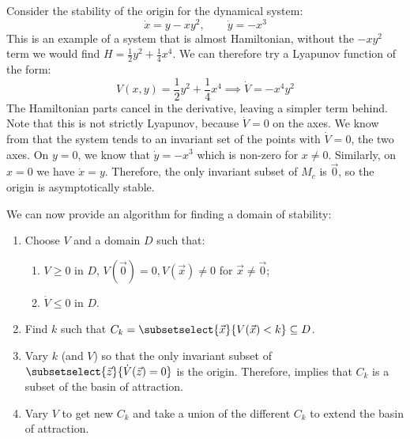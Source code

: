 \documentclass[../Main.tex]{subfiles}
\begin{document}
\begin{example}
    Consider the stability of the origin for the dynamical system:
    \begin{equation*}
        \dot{x} = y - xy^2,\qquad \dot{y} = -x^3
    \end{equation*}
    This is an example of a system that is almost Hamiltonian, without the $-xy^2$ term we would find $H = \frac12 y^2 + \frac14 x^4$. We can therefore try a Lyapunov function of the form:
    \begin{equation*}
        V(x, y) = \frac12 y^2 + \frac14 x^4 \implies \dot{V} = -x^4 y^2
    \end{equation*}
    The Hamiltonian parts cancel in the derivative, leaving a simpler term behind. Note that this is not strictly Lyapunov, because $\dot{V} = 0$ on the axes. We know from  that the system tends to an invariant set of the points with $\dot{V} = 0$, the two axes. On $y = 0$, we know that $\dot{y} = -x^3$ which is non-zero for $x \neq 0$. Similarly, on $x = 0$ we have $\dot{x} = y$. Therefore, the only invariant subset of $M_c$ is $\vec0$, so the origin is asymptotically stable.
\end{example}
We can now provide an algorithm for finding a domain of stability:
\begin{enumerate}
    \item Choose $V$ and a domain $D$ such that:
    \begin{enumerate}
        \item $V \geq 0$ in $D$, $V(\vec0) = 0, V(\vec{x}) \neq 0$ for $\vec{x} \neq \vec0$;
        \item $\dot{V} \leq 0$ in $D$.
    \end{enumerate}
    \item Find $k$ such that $C_k = \subsetselect{\vec{x}}{V(\vec{x}) < k} \subseteq D$.
    \item Vary $k$ (and $V$) so that the only invariant subset of $\subsetselect{\vec{z}}{\dot{V}(\vec{z}) = 0}$ is the origin. Therefore,  implies that $C_k$ is a subset of the basin of attraction.
    \item Vary $V$ to get new $C_k$ and take a union of the different $C_k$ to extend the basin of attraction.
\end{enumerate}
\end{document}
